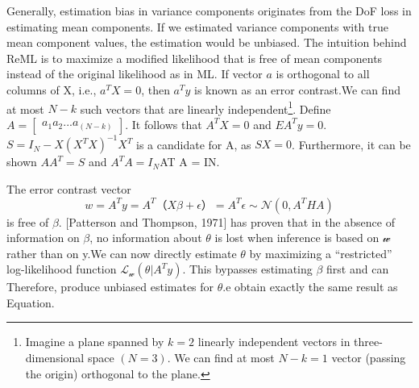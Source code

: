\documentclass[a4paper,11pt]{article}
\begin{document}
Generally, estimation bias in variance components originates from the DoF loss in estimating mean components. If we estimated variance components with true mean component values, the estimation would be unbiased. 
The intuition behind ReML is to maximize a modified likelihood that is free of mean components instead of the original likelihood as in ML.
If vector $a$ is orthogonal to all columns of X, i.e., $a^T X = 0 $, then $a^T y$ is known as an error contrast.We can find at most $N-k$ such vectors that are linearly independent\footnote{ Imagine a plane spanned by $k = 2$ linearly independent vectors in three-dimensional space $(N = 3)$. We can find at most $N - k = 1$ vector (passing the origin) orthogonal to the plane.}. Define $A =\begin{bmatrix} a_1 a_2 ... a_(N-k) \end{bmatrix}$. It follows that $A^T X = 0$ and $E{A^T y} = 0$. $S = I_N - X(X^T X)^{-1} X^T $ is a candidate for A, as $SX = 0$. Furthermore, it can be shown $A A^T = S$ and $A^T A = I_N$AT A = IN.

The error contrast vector 
\begin{equation}\label{eq1} 
         w = A^T y = A^T（X \beta + \epsilon）= A^T \epsilon \sim \mathcal{N}(0,A^T H A)
\end{equation}
 is free of $\beta$. [Patterson and Thompson, 1971] has proven that in the absence of information on $\beta$, no information about $\theta$ is lost when inference is based on $\mathcal{w}$ rather than on y.We can now directly estimate $\theta$ by maximizing a “restricted” log-likelihood function $\mathcal{L_w}(\theta| A^T y)$. This bypasses estimating $\beta$ first and can Therefore, produce unbiased estimates for $\theta$.e obtain exactly the same result as Equation.
\end{document}
